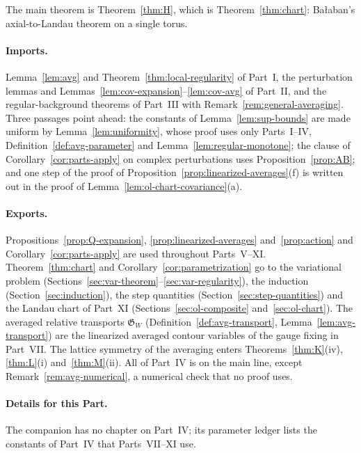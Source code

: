 The main theorem is Theorem~\ref{thm:H}, which is Theorem~\ref{thm:chart}: Ba\l aban's axial-to-Landau theorem \cite[Theorem~2]{BalReg} on a single torus.

\paragraph{Imports.} Lemma~\ref{lem:avg} and Theorem~\ref{thm:local-regularity} of Part~I, the perturbation lemmas and Lemmas~\ref{lem:cov-expansion}--\ref{lem:cov-avg} of Part~II, and the regular-background theorems of Part~III with Remark~\ref{rem:general-averaging}. Three passages point ahead: the constants of Lemma~\ref{lem:sup-bounds} are made uniform by Lemma~\ref{lem:uniformity}, whose proof uses only Parts~I--IV, Definition~\ref{def:avg-parameter} and Lemma~\ref{lem:regular-monotone}; the clause of Corollary~\ref{cor:parts-apply} on complex perturbations uses Proposition~\ref{prop:AB}; and one step of the proof of Proposition~\ref{prop:linearized-averages}(f) is written out in the proof of Lemma~\ref{lem:ol-chart-covariance}(a).

\paragraph{Exports.} Propositions~\ref{prop:Q-expansion}, \ref{prop:linearized-averages} and~\ref{prop:action} and Corollary~\ref{cor:parts-apply} are used throughout Parts~V--XI. Theorem~\ref{thm:chart} and Corollary~\ref{cor:parametrization} go to the variational problem (Sections~\ref{sec:var-theorem}--\ref{sec:var-regularity}), the induction (Section~\ref{sec:induction}), the step quantities (Section~\ref{sec:step-quantities}) and the Landau chart of Part~XI (Sections~\ref{sec:ol-composite} and~\ref{sec:ol-chart}). The averaged relative transports $\mathfrak G_W$ (Definition~\ref{def:avg-transport}, Lemma~\ref{lem:avg-transport}) are the linearized averaged contour variables of the gauge fixing in Part~VII. The lattice symmetry of the averaging enters Theorems~\ref{thm:K}(iv), \ref{thm:L}(i) and~\ref{thm:M}(ii). All of Part~IV is on the main line, except Remark~\ref{rem:avg-numerical}, a numerical check that no proof uses.

\paragraph{Details for this Part.} The companion has no chapter on Part~IV; its parameter ledger lists the constants of Part~IV that Parts~VII--XI use.
